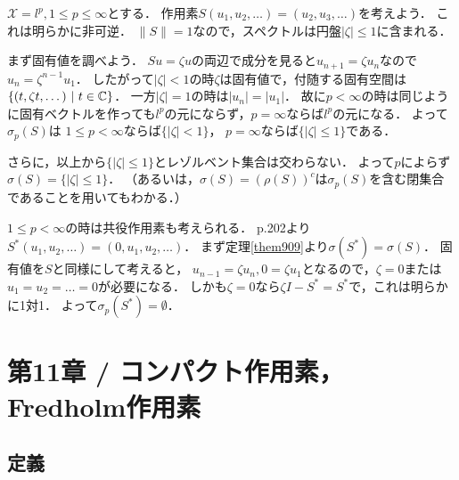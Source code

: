 \documentclass[a4j]{jsarticle}
\newcommand{\spX}{\mathscr{X}}
\begin{document}
        \begin{Example}[例9.17, p.217]
            $\spX=l^p, 1 \leq p \leq \infty$とする．
            作用素$S(u_1,u_2,\dots)=(u_2,u_3,\dots)$を考えよう．
            これは明らかに非可逆．
            $\|S\|=1$なので，スペクトルは円盤$|\zeta| \leq 1$に含まれる．

            まず固有値を調べよう．
            $S u=\zeta u$の両辺で成分を見ると$u_{n+1}=\zeta u_{n}$なので$u_n=\zeta^{n-1} u_1$．
            したがって$|\zeta|<1$の時$\zeta$は固有値で，付随する固有空間は$\{(t, \zeta t, \dots) ~|~ t \in \mathbb{C} \}$．
            一方$|\zeta|=1$の時は$|u_n|=|u_1|$．
            故に$p<\infty$の時は同じように固有ベクトルを作っても$l^p$の元にならず，$p=\infty$ならば$l^p$の元になる．
            よって$\sigma_p(S)$は
            $1 \leq p < \infty$ならば$\{ |\zeta| < 1 \}$，
            $p=\infty$ならば$\{|\zeta| \leq 1\}$である．

            さらに，以上から$\{|\zeta| \leq 1\}$とレゾルベント集合は交わらない．
            よって$p$によらず$\sigma(S)=\{|\zeta| \leq 1\}$．
            （あるいは，$\sigma(S)=(\rho(S))^c$は$\sigma_p(S)$を含む閉集合であることを用いてもわかる．）

            $1 \leq p < \infty$の時は共役作用素も考えられる．
            p.202より$S^* (u_1,u_2,\dots)=(0,u_1,u_2,\dots)$．
            まず定理\ref{them909}より$\sigma(S^*)=\sigma(S)$．
            固有値を$S$と同様にして考えると，
            $u_{n-1}=\zeta u_n, 0=\zeta u_1$となるので，$\zeta=0$または$u_1=u_2=\dots=0$が必要になる．
            しかも$\zeta=0$なら$\zeta I-S^*=S^*$で，これは明らかに1対1．
            よって$\sigma_p(S^*)=\emptyset$．
        \end{Example}

\section{第11章 / コンパクト作用素，Fredholm作用素}
    \subsection{定義}
\end{document}
